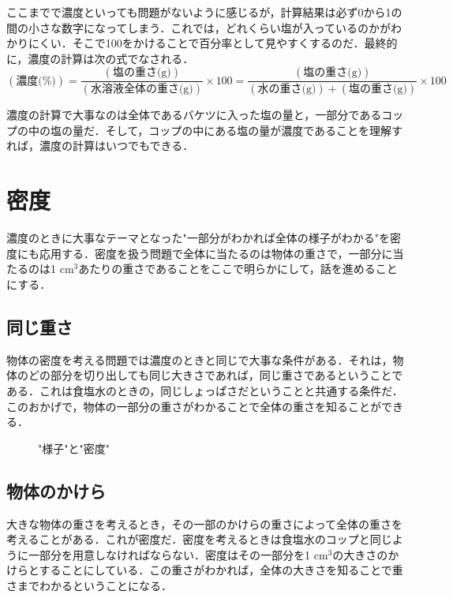 \documentclass[dvipdfmx]{jsarticle}
\begin{document}
    ここまでで濃度といっても問題がないように感じるが，計算結果は必ず0から1の間の小さな数字になってしまう．これでは，どれくらい塩が入っているのかがわかりにくい．そこで100をかけることで百分率として見やすくするのだ．最終的に，濃度の計算は次の式でなされる．
    \begin{equation}
        (\text{濃度(\%)})=\frac{(\text{塩の重さ(g)})}{(\text{水溶液全体の重さ(g)})}\times 100=\frac{(\text{塩の重さ(g)})}{(\text{水の重さ(g)})+(\text{塩の重さ(g)})}\times 100
        \label{eq_concentration}
    \end{equation}

    濃度の計算で大事なのは全体であるバケツに入った塩の量と，一部分であるコップの中の塩の量だ．そして，コップの中にある塩の量が濃度であることを理解すれば，濃度の計算はいつでもできる．

    \section{密度}
    濃度のときに大事なテーマとなった"一部分がわかれば全体の様子がわかる"を密度にも応用する．密度を扱う問題で全体に当たるのは物体の重さで，一部分に当たるのは1 \(\mathrm{cm}^3\)あたりの重さであることをここで明らかにして，話を進めることにする．

    \subsection{同じ重さ}
    物体の密度を考える問題では濃度のときと同じで大事な条件がある．それは，物体のどの部分を切り出しても同じ大きさであれば，同じ重さであるということである．これは食塩水のときの，同じしょっぱさだということと共通する条件だ．このおかげで，物体の一部分の重さがわかることで全体の重さを知ることができる．

    \begin{figure}[htbp]\centering
        \caption{"様子"と"密度"}
        \label{tikz_density_image}
    \end{figure}


    \subsection{物体のかけら}
    大きな物体の重さを考えるとき，その一部のかけらの重さによって全体の重さを考えることがある．これが密度だ．密度を考えるときは食塩水のコップと同じように一部分を用意しなければならない．密度はその一部分を1 \(\mathrm{cm}^3\)の大きさのかけらとすることにしている．この重さがわかれば，全体の大きさを知ることで重さまでわかるということになる．
\end{document}
